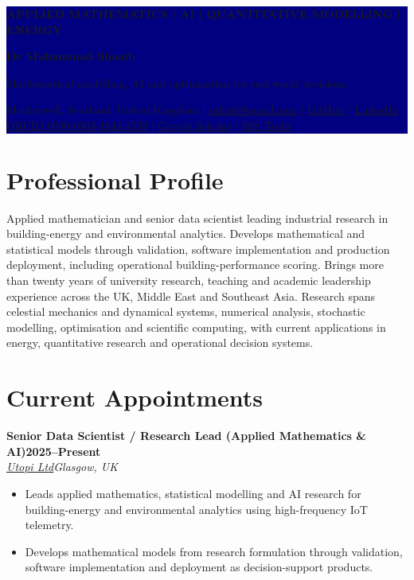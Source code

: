 \documentclass[10pt,a4paper]{article}
\newcommand{\cvrole}[4]{\textbf{#1}\hfill\textbf{#2}\\[-1pt]\textit{#3}\hfill\textit{#4}\par}
\begin{document}
\noindent\colorbox{navy}{%
  \parbox{\dimexpr\linewidth-2\fboxsep\relax}{%
    \vspace{9pt}
    {\color{green}\bfseries\small APPLIED MATHEMATICS \;|\; AI \;|\; QUANTITATIVE MODELLING \;|\; ENERGY}\par
    \vspace{5pt}
    {\fontsize{24}{26}\selectfont\bfseries\color{white} Dr Muhammad Shoaib}\par
    \vspace{3pt}
    {\large\color{white} Mathematical modelling, AI and optimisation for real-world decisions}\par
    \vspace{6pt}
    {\small\color{white}
      Motherwell, Scotland, United Kingdom \quad | \quad
      \href{mailto:safridi@gmail.com}{safridi@gmail.com} \quad | \quad
      \href{https://github.com/drmshoaib}{GitHub} \quad | \quad
      \href{https://www.linkedin.com/in/drmshoaib}{LinkedIn}\\
      \href{https://orcid.org/0000-0003-1644-1559}{ORCID 0000-0003-1644-1559} \quad | \quad
      \href{https://scholar.google.com/citations?user=VCSUWUEAAAAJ}{Google Scholar} \quad | \quad
      \href{https://www.ssstechs.com/}{SSS Techs}
    }
    \vspace{9pt}
  }
}

\section{Professional Profile}
Applied mathematician and senior data scientist leading industrial research in building-energy and environmental analytics. Develops mathematical and statistical models through validation, software implementation and production deployment, including operational building-performance scoring. Brings more than twenty years of university research, teaching and academic leadership experience across the UK, Middle East and Southeast Asia. Research spans celestial mechanics and dynamical systems, numerical analysis, stochastic modelling, optimisation and scientific computing, with current applications in energy, quantitative research and operational decision systems.

\section{Current Appointments}
\cvrole{Senior Data Scientist / Research Lead (Applied Mathematics \& AI)}{2025--Present}{\href{https://www.utopi.co.uk/}{Utopi Ltd}}{Glasgow, UK}
\begin{itemize}
\item Leads applied mathematics, statistical modelling and AI research for building-energy and environmental analytics using high-frequency IoT telemetry.
\item Develops mathematical models from research formulation through validation, software implementation and deployment as decision-support products.
\end{itemize}
\end{document}
